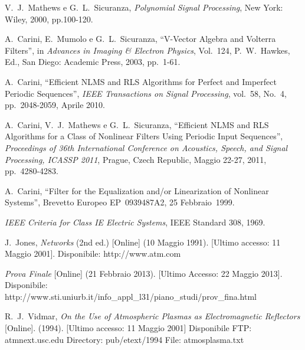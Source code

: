 \begin{thebibliography}{999}

V.~J.~Mathews e G.~L.~Sicuranza,
{\em Polynomial Signal Processing},
New York: Wiley, 2000, pp.100-120.

A.~Carini, E.~Mumolo e G.~L.~Sicuranza,
``V-Vector Algebra and Volterra Filters'',
in {\em Advances in Imaging \& Electron Physics}, Vol.~124,
P.~W.~Hawkes, Ed., San Diego: Academic Press, 2003, pp.~1-61. 

A.~Carini,
``Efficient NLMS and RLS Algorithms for Perfect and Imperfect Periodic Sequences'',
{\em IEEE Transactions on Signal Processing}, vol.~58, No.~4, pp.~2048-2059, Aprile 2010.

A.~Carini, V.~J.~Mathews e G.~L.~Sicuranza,
``Efficient NLMS and RLS Algorithms for a Class of Nonlinear Filters Using Periodic Input Sequences'',
{\em Proceedings of 36th International Conference on Acoustics, Speech, and Signal Processing, ICASSP 2011},
Prague, Czech Republic, Maggio 22-27, 2011, pp.~4280-4283.

A.~Carini,
``Filter for the Equalization and/or Linearization of Nonlinear Systems'',
Brevetto Europeo EP~0939487A2, 25 Febbraio~1999.

{\em IEEE Criteria for Class IE Electric Systems}, IEEE Standard 308, 1969.

J.~Jones,
{\em Networks} (2nd ed.) [Online] (10 Maggio 1991). [Ultimo accesso: 11 Maggio 2001].
Disponibile: http://www.atm.com 

{\em Prova Finale} [Online] (21 Febbraio 2013). [Ultimo Accesso: 22 Maggio 2013].
Disponibile: http://www.sti.uniurb.it/info\_appl\_l31/piano\_studi/prov\_fina.html

R.~J.~Vidmar,
{\em On the Use of Atmospheric Plasmas as Electromagnetic Reflectors} [Online]. (1994).
[Ultimo accesso: 11 Maggio 2001]
Disponibile FTP: atmnext.usc.edu Directory: pub/etext/1994 File: atmosplasma.txt


\end{thebibliography}
